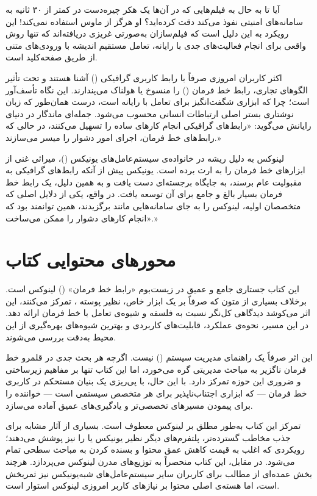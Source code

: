 آیا تا به حال به فیلم‌هایی که در آن‌ها یک هکر چیره‌دست در کمتر از ۳۰ ثانیه به سامانه‌های امنیتی نفوذ می‌کند دقت کرده‌اید؟ او هرگز از ماوس استفاده نمی‌کند! این رویکرد به این دلیل است که فیلم‌سازان به‌صورتی غریزی دریافته‌اند که تنها روش واقعی برای انجام فعالیت‌های جدی با رایانه، تعامل مستقیم اندیشه با ورودی‌های متنی از طریق صفحه‌کلید است.

اکثر کاربران امروزی صرفاً با رابط کاربری گرافیکی () آشنا هستند و تحت تأثیر الگوهای تجاری، رابط خط فرمان () را منسوخ یا هولناک می‌پندارند. این نگاه تأسف‌آور است؛ چرا که  ابزاری شگفت‌انگیز برای تعامل با رایانه است، درست همان‌طور که زبان نوشتاری بستر اصلی ارتباطات انسانی محسوب می‌شود. جمله‌ای ماندگار در دنیای رایانش می‌گوید: «رابط‌های گرافیکی انجام کارهای ساده را تسهیل می‌کنند، در حالی که رابط‌های خط فرمان، اجرای امور دشوار را میسر می‌سازند.»

لینوکس به دلیل ریشه در خانواده‌ی سیستم‌عامل‌های یونیکس ()، میراثی غنی از ابزارهای خط فرمان را به ارث برده است. یونیکس پیش از آنکه رابط‌های گرافیکی به مقبولیت عام برسند، به جایگاه برجسته‌ای دست یافت و به همین دلیل، یک رابط خط فرمان بسیار بالغ و جامع برای آن توسعه یافت. در واقع، یکی از دلایل اصلی که متخصصان اولیه، لینوکس را به جای سامانه‌هایی مانند  برگزیدند، همین  توانمند بود که «انجام کارهای دشوار را ممکن می‌ساخت.»

\section*{محورهای محتوایی کتاب}

این کتاب جستاری جامع و عمیق در زیست‌بوم «رابط خط فرمان» () لینوکس است. برخلاف بسیاری از متون که صرفاً بر یک ابزار خاص، نظیر پوسته ، تمرکز می‌کنند، این اثر می‌کوشد دیدگاهی کل‌نگر نسبت به فلسفه و شیوه‌ی تعامل با خط فرمان ارائه دهد. در این مسیر، نحوه‌ی عملکرد، قابلیت‌های کاربردی و بهترین شیوه‌های بهره‌گیری از این محیط به‌دقت بررسی می‌شوند.

این اثر صرفاً یک راهنمای مدیریت سیستم () نیست. اگرچه هر بحث جدی در قلمرو خط فرمان ناگزیر به مباحث مدیریتی گره می‌خورد، اما این کتاب تنها بر مفاهیم زیرساختی و ضروری این حوزه تمرکز دارد. با این حال، با پی‌ریزی یک بنیان مستحکم در کاربری خط فرمان — که ابزاری اجتناب‌ناپذیر برای هر متخصص سیستمی است — خواننده را برای پیمودن مسیرهای تخصصی‌تر و یادگیری‌های عمیق آماده می‌سازد.

تمرکز این کتاب به‌طور مطلق بر لینوکس معطوف است. بسیاری از آثار مشابه برای جذب مخاطب گسترده‌تر، پلتفرم‌های دیگر نظیر یونیکس یا  را نیز پوشش می‌دهند؛ رویکردی که اغلب به قیمت کاهش عمق محتوا و بسنده کردن به مباحث سطحی تمام می‌شود. در مقابل، این کتاب منحصراً به توزیع‌های مدرن لینوکس می‌پردازد. هرچند بخش عمده‌ای از مطالب برای کاربران سایر سیستم‌عامل‌های شبه‌یونیکس نیز ثمر‌بخش است، اما هسته‌ی اصلی محتوا بر نیازهای کاربر امروزی لینوکس استوار است.

